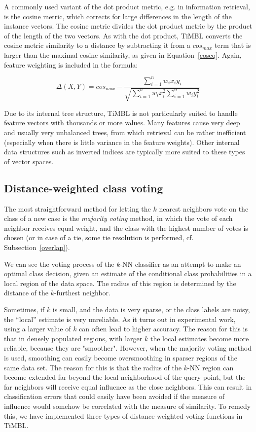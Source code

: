 \documentclass{report}
\begin{document}
A commonly used variant of the dot product metric, e.g. in information
retrieval, is the cosine metric, which corrects for large differences
in the length of the instance vectors. The cosine metric divides the
dot product metric by the product of the length of the two vectors. As
with the dot product, TiMBL converts the cosine metric similarity to a
distance by subtracting it from a $cos_{max}$ term that is larger than
the maximal cosine similarity, as given in
Equation~\ref{coseq}. Again, feature weighting is included in the
formula:

\begin{equation}
\label{coseq}
\Delta(X,Y) = cos_{max} - \frac{\sum_{i=1}^{n} w_{i} x_{i} y_{i}}{\sqrt{\sum_{i=1}^{n} w_{i} x_{i}^2 \sum_{i=1}^{n} w_{i} y_{i}^2}}
\end{equation}

Due to its internal tree structure, TiMBL is not particularly suited
to handle feature vectors with thousands or more values. Many features
cause very deep and usually very unbalanced trees, from which
retrieval can be rather inefficient (especially when there is little
variance in the feature weights). Other internal data structures such as
inverted indices are typically more suited to these types of vector
spaces.

\subsection{Distance-weighted class voting}
\label{distweightvote}

The most straightforward method for letting the $k$ nearest neighbors
vote on the class of a new case is the {\em majority voting} method,
in which the vote of each neighbor receives equal weight, and the
class with the highest number of votes is chosen (or in case of a tie,
some tie resolution is performed, cf. Subsection~\ref{overlap}).

We can see the voting process of the $k$-NN classifier as an attempt
to make an optimal class decision, given an estimate of the
conditional class probabilities in a local region of the data space.
The radius of this region is determined by the distance of the
$k$-furthest neighbor.

Sometimes, if $k$ is small, and the data is very sparse, or the class
labels are noisy, the ``local'' estimate is very unreliable.  As it
turns out in experimental work, using a larger value of $k$ can often
lead to higher accuracy. The reason for this is that in densely
populated regions, with larger $k$ the local estimates become more
reliable, because they are "smoother".  However, when the majority
voting method is used, smoothing can easily become oversmoothing in
sparser regions of the same data set. The reason for this is that the
radius of the $k$-NN region can become extended far beyond the local
neighborhood of the query point, but the far neighbors will receive
equal influence as the close neighbors. This can result in
classification errors that could easily have been avoided if the
measure of influence would somehow be correlated with the measure of
similarity. To remedy this, we have implemented three types of distance 
weighted voting functions in TiMBL.
\end{document}
